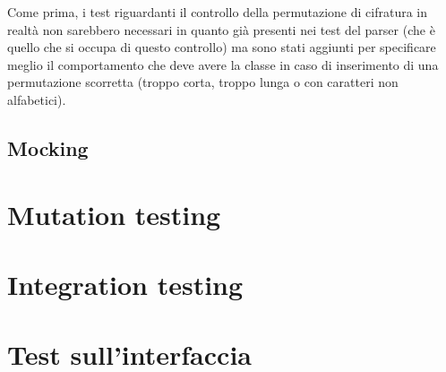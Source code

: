			Come prima, i test riguardanti il controllo della permutazione di cifratura in realtà non sarebbero necessari in quanto già presenti nei test del parser (che è quello che si occupa di questo controllo) ma sono stati aggiunti per specificare meglio il comportamento che deve avere la classe in caso di inserimento di una permutazione scorretta (troppo corta, troppo lunga o con caratteri non alfabetici).
			
		\subsection{Mocking}
	\section{Mutation testing}
	\section{Integration testing}
	\section{Test sull'interfaccia}